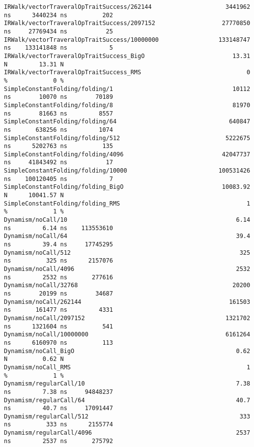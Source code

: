 \begin{code}
\begin{verbatim}
IRWalk/vectorTraveralOpTraitSuccess/262144                     3441962 ns      3440234 ns          202
IRWalk/vectorTraveralOpTraitSuccess/2097152                   27770850 ns     27769434 ns           25
IRWalk/vectorTraveralOpTraitSuccess/10000000                 133148747 ns    133141848 ns            5
IRWalk/vectorTraveralOpTraitSuccess_BigO                         13.31 N         13.31 N
IRWalk/vectorTraveralOpTraitSuccess_RMS                              0 %             0 %
SimpleConstantFolding/folding/1                                  10112 ns        10070 ns        70189
SimpleConstantFolding/folding/8                                  81970 ns        81663 ns         8557
SimpleConstantFolding/folding/64                                640847 ns       638256 ns         1074
SimpleConstantFolding/folding/512                              5222675 ns      5202763 ns          135
SimpleConstantFolding/folding/4096                            42047737 ns     41843492 ns           17
SimpleConstantFolding/folding/10000                          100531426 ns    100120405 ns            7
SimpleConstantFolding/folding_BigO                            10083.92 N      10041.57 N
SimpleConstantFolding/folding_RMS                                    1 %             1 %
Dynamism/noCall/10                                                6.14 ns         6.14 ns    113553610
Dynamism/noCall/64                                                39.4 ns         39.4 ns     17745295
Dynamism/noCall/512                                                325 ns          325 ns      2157076
Dynamism/noCall/4096                                              2532 ns         2532 ns       277616
Dynamism/noCall/32768                                            20200 ns        20199 ns        34687
Dynamism/noCall/262144                                          161503 ns       161477 ns         4331
Dynamism/noCall/2097152                                        1321702 ns      1321604 ns          541
Dynamism/noCall/10000000                                       6161264 ns      6160970 ns          113
Dynamism/noCall_BigO                                              0.62 N          0.62 N
Dynamism/noCall_RMS                                                  1 %             1 %
Dynamism/regularCall/10                                           7.38 ns         7.38 ns     94848237
Dynamism/regularCall/64                                           40.7 ns         40.7 ns     17091447
Dynamism/regularCall/512                                           333 ns          333 ns      2155774
Dynamism/regularCall/4096                                         2537 ns         2537 ns       275792

\end{verbatim}
\end{code}
